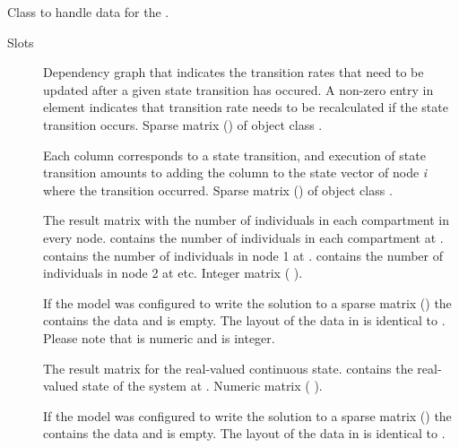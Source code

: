 \documentclass[letterpaper]{book}
\begin{document}
%
\begin{Description}
Class to handle data for the .
\end{Description}
%
\begin{Section}{Slots}

\begin{description}

\item[] Dependency graph that indicates the transition rates that
need to be updated after a given state transition has occured.
A non-zero entry in element  indicates that
transition rate  needs to be recalculated if the state
transition  occurs. Sparse matrix ()
of object class
.

\item[] Each column corresponds to a state transition, and
execution of state transition  amounts to adding the
 column to the state vector  of node
\emph{i} where the transition occurred. Sparse matrix () of object class
.

\item[] The result matrix with the number of individuals in each
compartment in every node.  contains the number
of individuals in each compartment at
.  contains the number of
individuals in node 1 at .  contains the number of individuals in node 2 at
 etc. Integer matrix (
).

\item[] If the model was configured to write the solution
to a sparse matrix
() the
 contains the data and  is empty. The
layout of the data in  is identical to
. Please note that  is numeric and
 is integer.

\item[] The result matrix for the real-valued continuous
state.  contains the real-valued state of the
system at . Numeric matrix
( \eqn{\times}{}
).

\item[] If the model was configured to write the solution
to a sparse matrix
() the
 contains the data and  is empty. The
layout of the data in  is identical to
.


\end{description}
\end{Section}
\end{document}
